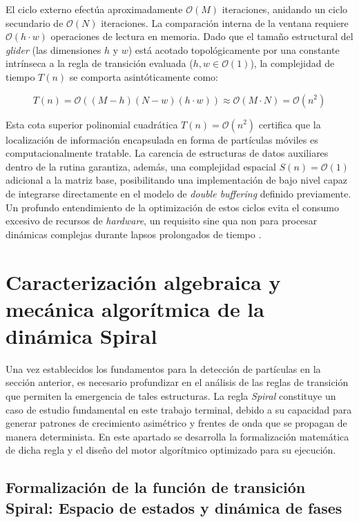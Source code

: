 El ciclo externo efectúa aproximadamente $\mathcal{O}(M)$ iteraciones, anidando un ciclo secundario de $\mathcal{O}(N)$ iteraciones. La comparación interna de la ventana requiere $\mathcal{O}(h \cdot w)$ operaciones de lectura en memoria. Dado que el tamaño estructural del \textit{glider} (las dimensiones $h$ y $w$) está acotado topológicamente por una constante intrínseca a la regla de transición evaluada ($h, w \in \mathcal{O}(1)$), la complejidad de tiempo $T(n)$ se comporta asintóticamente como:

\begin{equation}
T(n) = \mathcal{O}((M - h)(N - w)(h \cdot w)) \approx \mathcal{O}(M \cdot N) = \mathcal{O}(n^2)
\label{eq:complejidad_busqueda}
\end{equation}

Esta cota superior polinomial cuadrática $T(n) = \mathcal{O}(n^2)$ certifica que la localización de información encapsulada en forma de partículas móviles es computacionalmente tratable. La carencia de estructuras de datos auxiliares dentro de la rutina garantiza, además, una complejidad espacial $S(n) = \mathcal{O}(1)$ adicional a la matriz base, posibilitando una implementación de bajo nivel capaz de integrarse directamente en el modelo de \textit{double buffering} definido previamente. Un profundo entendimiento de la optimización de estos ciclos evita el consumo excesivo de recursos de \textit{hardware}, un requisito sine qua non para procesar dinámicas complejas durante lapsos prolongados de tiempo \cite{Wolfram2002}.



\section{Caracterización algebraica y mecánica algorítmica de la dinámica Spiral}
\label{sec:dinamica_spiral}

Una vez establecidos los fundamentos para la detección de partículas en la sección anterior, es necesario profundizar en el análisis de las reglas de transición que permiten la emergencia de tales estructuras. La regla \textit{Spiral} constituye un caso de estudio fundamental en este trabajo terminal, debido a su capacidad para generar patrones de crecimiento asimétrico y frentes de onda que se propagan de manera determinista. En este apartado se desarrolla la formalización matemática de dicha regla y el diseño del motor algorítmico optimizado para su ejecución.

\subsection{Formalización de la función de transición Spiral: Espacio de estados y dinámica de fases}
\label{subsec:formalizacion_spiral}

